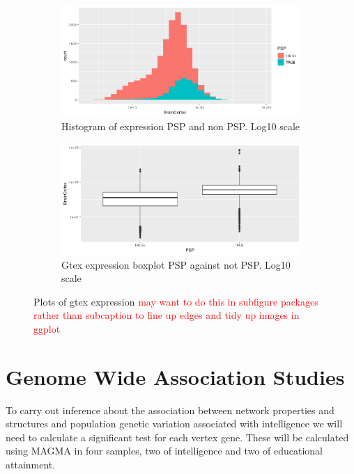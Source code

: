 \begin{figure}
    \centering
    \begin{subfigure}[t]{0.45\textwidth}
        \centering
        \includegraphics[width=\linewidth]{images/Rplot_corrected_gtex_histogram_log.png} 
        \caption{Histogram of expression PSP and non PSP. Log10 scale} \label{fig:gtex_histogram_log}
    \end{subfigure}
    \hfill
    \begin{subfigure}[t]{0.45\textwidth}
        \centering
        \includegraphics[width=\linewidth]{images/Rplot_corrected_gtex_boxplot_log10.png} 
        \caption{Gtex expression boxplot PSP against not PSP. Log10 scale} \label{fig:gtex_log_boxplot}
    \end{subfigure}
    \caption{Plots of gtex expression \textcolor{red}{may want to do this in subfigure packages rather than subcaption to line up edges and tidy up images in ggplot}}
    \label{fig:all_gtex_panels}
\end{figure}

\section{Genome Wide Association Studies}

To carry out inference about the association between network properties and structures and population genetic variation associated with intelligence we will need to calculate a significant test for each vertex gene. These will be calculated using MAGMA in four samples, two of intelligence and two of educational attainment.\cite{de2015magma}


